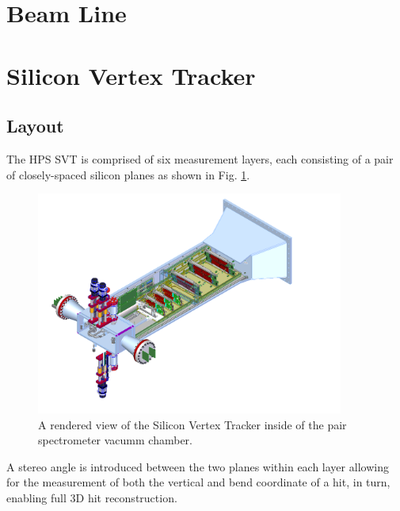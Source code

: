 \section{Beam Line}

\section*{Silicon Vertex Tracker}

\subsection*{Layout}

The HPS SVT is comprised of six measurement layers, each consisting of a pair of
closely-spaced silicon planes as shown in Fig. \ref{fig:svt_layout_render}.
\begin{figure}[h]
    \centering
    \includegraphics[width=0.9\textwidth]{images/svt_layout_render.png}
    \caption{A rendered view of the Silicon Vertex Tracker inside of the pair
             spectrometer vacumm chamber.}
    \label{fig:svt_layout_render}
\end{figure}
A stereo angle is introduced between the two planes within each layer allowing
for the measurement of both the vertical and bend coordinate of a hit, in turn, 
enabling full 3D hit reconstruction.  

